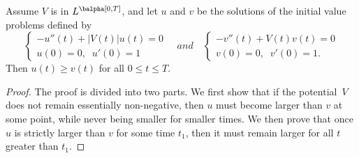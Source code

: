 \begin{prop}
\label{positivitythm}
Assume $V$ is in $L^\balpha[0,T]$, and let $u$ and $v$ be the solutions of the initial value problems defined by
\[
\begin{cases}
-u''(t)+|V(t)|u(t)=0\\
u(0)=0, \;\; u'(0)=1
\end{cases}
\quad and \quad
\begin{cases}
-v''(t)+V(t)v(t)=0\\
v(0)=0, \;\; v'(0)=1.
\end{cases}
\]
Then $u(t)\geq v(t)$ for all $0\leq t\leq T$.
\end{prop}
\begin{proof}
The proof is divided into two parts. We first show that if the potential~$V$ does not remain essentially non-negative, then $u$ must
become larger than $v$ at some point, while never being smaller for smaller times. We then prove that once $u$ is strictly larger
than
$v$ for some time $t_{1}$, then it must remain larger for all $t$ greater than $t_{1}$.


\end{proof}
